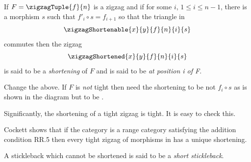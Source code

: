 If $F=\zigzagTuple{f}{n}$ is a zigzag and 
if for some $i$,
$1 \leq i \leq n-1$,
there is a morphism
$s$ such that $f'_i \circ s = f_{i+1}$ so that the triangle in 
\[
\zigzagShortenable{x}{y}{f}{n}{i}{s}
\]
commutes then the zigzag 
\[
\arraycolsep=7pt
\zigzagShortened{x}{y}{f}{n}{i}{s}
\]
is said to be a \textit{shortening} of $F$ and is said to be \textit{at position i of F}.

\newcommand{\rngTightener}[2]
    {
          \rng{
                \rst{#1_{#2+1}} \circ #1'_{#2}
               }            
    }

\newcommand{\rngTightenerOne}[1]
    {
          \rng{
                \rst{#1_{2}} \circ #1'_{1}
               }            
    }

\newcommand{ \rstTightener}[2]
    {
          \rst{
                #1'_{#2} \circ \rng{#1_{#2}}  
               }
    } 
\begin{notebox}
Change the above. If $F$ is \emph{not} tight
then need the shortening to be not $f_i \circ s$ as is shown in the diagram but to be \oldt{$f_i \circ \rngTightener{f}{i} \circ s$}  
.
\end{notebox}

Significantly, the shortening of a tight zigzag is  tight.
It is easy to check this.

Cockett shows that if the category \catcw is a range category
satisfying the addition condition RR.5 then every tight
zigzag of morphisms in \catcw has a unique shortening. 

A stickleback which cannot be shortened is said to be
a \textit{short stickleback}.

